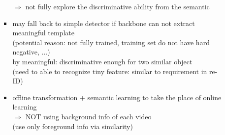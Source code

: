 \begin{itemize}
\begin{itemize}
\begin{itemize}
		$\Rightarrow$ not fully explore the discriminative ability from the semantic
		\item may fall back to simple detector if backbone can not extract meaningful template \\
		(potential reason: not fully trained, training set do not have hard negative, ...) \\ 
		by meaningful: discriminative enough for two similar object \\
		(need to able to recognize tiny feature: similar to requirement in re-ID)
		\item offline transformation + semantic learning to take the place of online learning \\
		$\Rightarrow$ NOT using background info of each video \\
		(use only foreground info via similarity)
		\end{itemize}
	\end{itemize}


\end{itemize}
